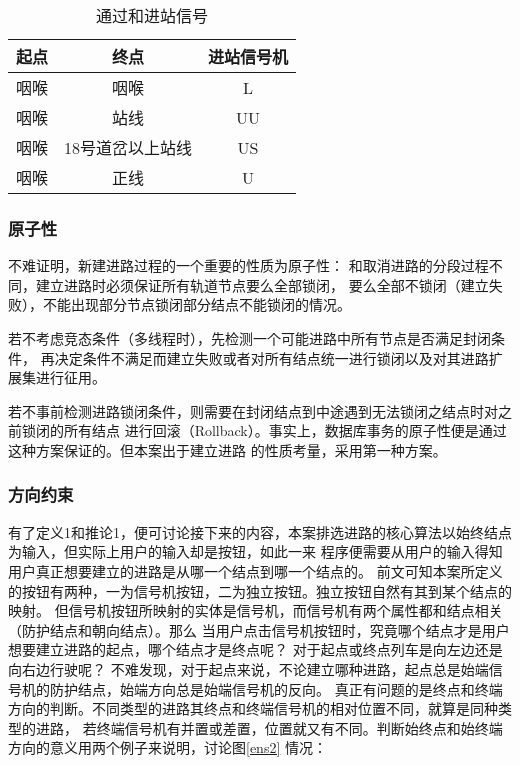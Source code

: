 \begin{table}[htpb!]
    \centering
    \caption{\label{homw_light}通过和进站信号}
    \begin{threeparttable}
        \begin{tabular}{ccc}
            \toprule
            起点 & 终点             & 进站信号机 \\
            \midrule
            咽喉 & 咽喉             & L          \\
            咽喉 & 站线             & UU         \\
            咽喉 & 18号道岔以上站线 & US         \\
            咽喉 & 正线             & U          \\
            \bottomrule
        \end{tabular}
    \end{threeparttable}
\end{table}
\subsubsection{原子性}
不难证明，新建进路过程的一个重要的性质为原子性：
和取消进路的分段过程不同，建立进路时必须保证所有轨道节点要么全部锁闭，
要么全部不锁闭（建立失败），不能出现部分节点锁闭部分结点不能锁闭的情况。

若不考虑竞态条件（多线程时），先检测一个可能进路中所有节点是否满足封闭条件，
再决定条件不满足而建立失败或者对所有结点统一进行锁闭以及对其进路扩展集进行征用。

若不事前检测进路锁闭条件，则需要在封闭结点到中途遇到无法锁闭之结点时对之前锁闭的所有结点
进行回滚（Rollback）。事实上，数据库事务的原子性便是通过这种方案保证的。但本案出于建立进路
的性质考量，采用第一种方案。

\subsubsection{方向约束}
有了定义1和推论1，便可讨论接下来的内容，本案排选进路的核心算法以始终结点为输入，但实际上用户的输入却是按钮，如此一来
程序便需要从用户的输入得知用户真正想要建立的进路是从哪一个结点到哪一个结点的。
前文可知本案所定义的按钮有两种，一为信号机按钮，二为独立按钮。独立按钮自然有其到某个结点的映射。
但信号机按钮所映射的实体是信号机，而信号机有两个属性都和结点相关（防护结点和朝向结点）。那么
当用户点击信号机按钮时，究竟哪个结点才是用户想要建立进路的起点，哪个结点才是终点呢？
对于起点或终点列车是向左边还是向右边行驶呢？
不难发现，对于起点来说，不论建立哪种进路，起点总是始端信号机的防护结点，始端方向总是始端信号机的反向。
真正有问题的是终点和终端方向的判断。不同类型的进路其终点和终端信号机的相对位置不同，就算是同种类型的进路，
若终端信号机有并置或差置，位置就又有不同。判断始终点和始终端方向的意义用两个例子来说明，讨论图\ref{ens2} 情况：

